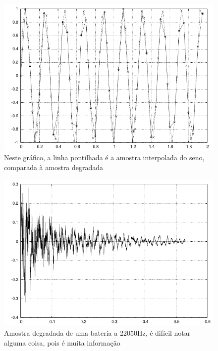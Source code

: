 \clearpage

\begin{figure}[h]
\begin{center}
\leavevmode
\includegraphics[scale=1]{../img/seno-comp.pdf} 
\caption{Neste gráfico, a linha pontilhada é a amostra interpolada do seno, comparada à amostra degradada}
\end{center}
\end{figure}

\begin{figure}[h]
\begin{center}
\leavevmode
\includegraphics[scale=1]{../img/drum01-22050-normal.pdf} 
\caption{Amostra degradada de uma bateria a 22050Hz, é difícil notar alguma coisa, pois é muita informação}
\end{center}
\end{figure}

